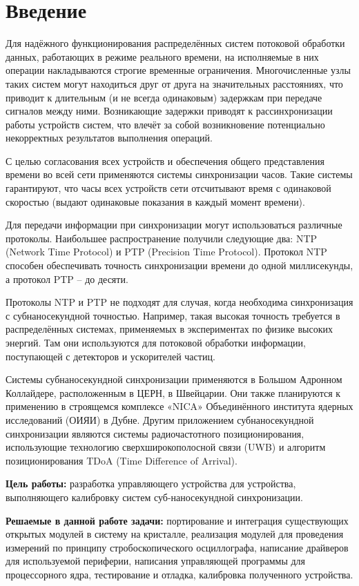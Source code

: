 \chapter*{Введение} %

Для надёжного функционирования распределённых систем потоковой обработки данных, работающих в
режиме реального времени, на исполняемые в них операции накладываются строгие временные ограничения.
Многочисленные узлы таких систем могут находиться друг от друга на значительных расстояниях, 
что приводит к длительным (и не всегда одинаковым) задержкам при передаче сигналов между ними.
Возникающие задержки приводят к рассинхронизации работы устройств систем, что влечёт за собой 
возникновение потенциально некорректных результатов выполнения операций. 

С целью согласования всех устройств и обеспечения общего представления времени во всей сети применяются 
системы синхронизации часов. Такие системы гарантируют, что часы всех устройств сети отсчитывают время с 
одинаковой скоростью (выдают одинаковые показания в каждый момент времени).

Для передачи информации при синхронизации могут использоваться различные протоколы.
Наибольшее распространение получили следующие два: NTP (Network Time Protocol) и PTP (Precision Time Protocol).
Протокол NTP способен обеспечивать точность синхронизации времени до одной миллисекунды, а протокол PTP – до десяти. 

Протоколы NTP и PTP не подходят для случая, когда необходима синхронизация с субнаносекундной точностью. Например, 
такая высокая точность требуется в распределённых системах, применяемых в экспериментах по физике высоких энергий.
Там они используются для потоковой обработки информации, поступающей с детекторов и ускорителей частиц. 

Системы субнаносекундной синхронизации применяются в Большом Адронном Коллайдере, расположенным в ЦЕРН, в Швейцарии. Они также
планируются к применению в строящемся комплексе «NICA» Объединённого института ядерных исследований (ОИЯИ) в Дубне. 
Другим приложением субнаносекундной синхронизации являются системы радиочастотного позиционирования,
использующие технологию сверхширокополосной связи (UWB) и алгоритм позиционирования TDoA (Time Difference of Arrival).

\textbf{Цель работы:} разработка управляющего устройства для устройства, выполняющего калибровку систем суб-наносекундной синхронизации.

\textbf{Решаемые в данной работе задачи:} портирование и интеграция существующих открытых модулей в систему на кристалле, 
реализация модулей для проведения измерений по принципу стробоскопического осциллографа, написание драйверов для используемой периферии,
написания управляющей программы для процессорного ядра, тестирование и отладка, калибровка полученного устройства.